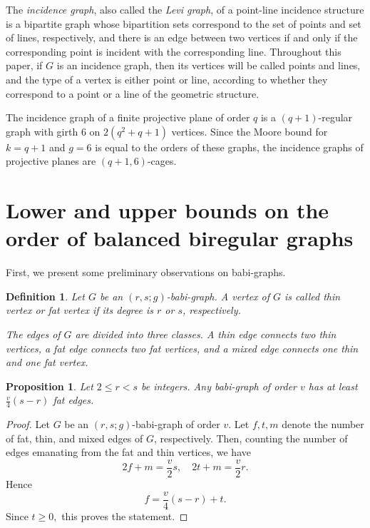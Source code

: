 \documentclass[a4paper,11pt]{article}
\newtheorem{proposition}[theorem]{Proposition}
\newtheorem{definition}[theorem]{Definition}
\begin{document}
The \emph{incidence graph}, also called the \emph{Levi graph}, of a point-line incidence structure is a bipartite graph whose bipartition sets correspond to the
set of points and set of lines, respectively, and there is an edge between two vertices if
and only if the corresponding point is incident with the corresponding line.  Throughout this paper, if $G$ is an incidence graph, then its vertices will be called points and lines, 
and the type of a vertex is either point or line, according to whether they correspond to a point or a line of the geometric structure. 

The incidence graph of a finite projective plane of order $q$ is a $(q+1)$-regular graph with girth 6
on $2(q^2+q+1)$ vertices.
Since the Moore bound for $k=q+1$ and $g=6$ is equal to the orders of these graphs, the incidence graphs of projective planes are $(q+1,6)$-cages.



\section{Lower and upper bounds on the order of balanced biregular graphs}\label{bounds}

First, we present some preliminary observations on babi-graphs.

\begin{definition}
Let $G$ be an $(r,s;g)$-babi-graph. A vertex of $G$ is called \emph{thin vertex} or
\emph{fat vertex} if its degree is $r$ or $s$, respectively.

The edges of $G$ are divided into three classes. A \emph{thin edge} connects two
thin vertices, a \emph{fat edge} connects two fat vertices, and a \emph{mixed edge}
connects one thin and one fat vertex. 
\end{definition}


\begin{proposition}\label{fatedges_Gyuri}
Let $2\leq r<s$ be integers. 
Any babi-graph of order $v$ has at least $\frac{v}{4}(s-r)$ fat edges. 
\end{proposition}

\begin{proof} 
Let $G$ be an $(r,s;g)$-babi-graph of order $v.$ Let $f,t,m$ denote the number of fat, thin, and mixed edges of $G$, respectively. 
Then, counting the number of edges emanating from the fat and thin vertices, we have
$$2f+m=\frac{v}{2}s, \quad 2t+m=\frac{v}{2}r.$$
Hence 
\begin{equation}
\label{fatedgenumber}
f=\frac{v}{4}(s-r)+t.
\end{equation}
Since $t\geq 0,$ this proves the statement.
\end{proof} 
\end{document}
